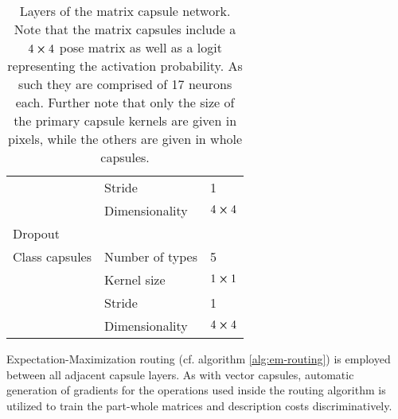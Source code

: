 \begin{table}[H]
\begin{tabular}{@{}lll@{}}
                         & Stride                  & 1                         \\
                         & Dimensionality          & $4\cross 4$               \\
Dropout                  &                         &                           \\
Class capsules           & Number of types         & 5                         \\
                         & Kernel size             & $1\cross 1$               \\
                         & Stride                  & 1                         \\
                         & Dimensionality          & $4\cross 4$               \\ \bottomrule
\end{tabular}
\caption[Layers of the matrix capsule network]{Layers of the matrix capsule network. Note that the matrix capsules include a $4\cross 4$ pose matrix as well as a logit representing the activation probability. As such they are comprised of 17 neurons each. Further note that only the size of the primary capsule kernels are given in pixels, while the others are given in whole capsules.}
\label{tab:matrix-config}
\end{table}\noindent
Expectation-Maximization routing (cf. algorithm \ref{alg:em-routing}) is employed between all adjacent capsule layers. As with vector capsules, automatic generation of gradients for the operations used inside the routing algorithm is utilized to train the part-whole matrices and description costs discriminatively.
